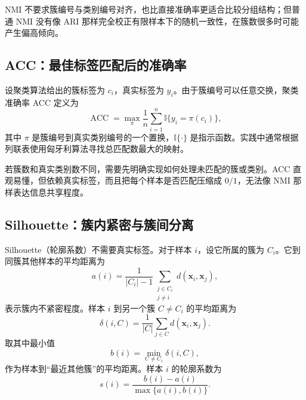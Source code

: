 \documentclass[UTF8,zihao=-4,openany]{ctexbook}
\begin{document}
NMI 不要求簇编号与类别编号对齐，也比直接准确率更适合比较分组结构；但普通 NMI 没有像 ARI 那样完全校正有限样本下的随机一致性，在簇数很多时可能产生偏高倾向。

\subsection{ACC：最佳标签匹配后的准确率}

设聚类算法给出的簇标签为 \(c_i\)，真实标签为 \(y_i\)。由于簇编号可以任意交换，聚类准确率 ACC 定义为
\begin{equation}
  \operatorname{ACC}
  =
  \max_{\pi}
  \frac{1}{n}
  \sum_{i=1}^{n}
  \mathbb I\{y_i=\pi(c_i)\},
  \label{eq:clustering-accuracy}
\end{equation}
其中 \(\pi\) 是簇编号到真实类别编号的一个置换，\(\mathbb I\{\cdot\}\) 是指示函数。实践中通常根据列联表使用匈牙利算法寻找总匹配数最大的映射。

若簇数和真实类别数不同，需要先明确实现如何处理未匹配的簇或类别。ACC 直观易懂，但依赖真实标签，而且把每个样本是否匹配压缩成 \(0/1\)，无法像 NMI 那样表达信息共享程度。

\subsection{Silhouette：簇内紧密与簇间分离}

Silhouette（轮廓系数）不需要真实标签。对于样本 \(i\)，设它所属的簇为 \(C_i\)。它到同簇其他样本的平均距离为
\begin{equation}
  a(i)
  =
  \frac{1}{|C_i|-1}
  \sum_{\substack{j\in C_i\\j\neq i}}
  d(\boldsymbol{x}_i,\boldsymbol{x}_j),
  \label{eq:silhouette-a}
\end{equation}
表示簇内不紧密程度。样本 \(i\) 到另一个簇 \(C\neq C_i\) 的平均距离为
\[
  \delta(i,C)
  =
  \frac{1}{|C|}
  \sum_{j\in C}d(\boldsymbol{x}_i,\boldsymbol{x}_j).
\]
取其中最小值
\begin{equation}
  b(i)
  =
  \min_{C\neq C_i}\delta(i,C),
  \label{eq:silhouette-b}
\end{equation}
作为样本到“最近其他簇”的平均距离。样本 \(i\) 的轮廓系数为
\begin{equation}
  s(i)
  =
  \frac{b(i)-a(i)}{\max\{a(i),b(i)\}}.
  \label{eq:silhouette}
\end{equation}
\end{document}
